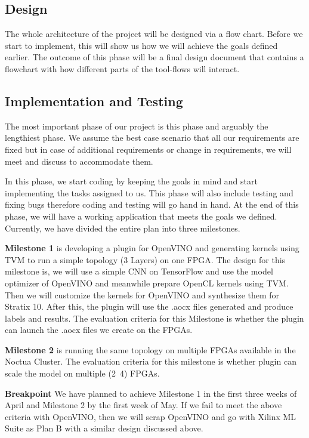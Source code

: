 \documentclass[titlepage]{report}
\begin{document}
\subsection{Design}
The whole architecture of the project will be designed via a flow chart. Before we start to implement, this will show us how we will achieve the goals defined earlier. The outcome of this phase will be a final design document that contains a flowchart with how different parts of the tool-flows will interact. 

\subsection{Implementation and Testing}
The most important phase of our project is this phase and arguably the lengthiest phase. We assume the best case scenario that all our requirements are fixed but in case of additional requirements or change in requirements, we will meet and discuss to accommodate them. 

In this phase, we start coding by keeping the goals in mind and start implementing the tasks assigned to us. This phase will also include testing and fixing bugs therefore coding and testing will go hand in hand. At the end of this phase, we will have a working application that meets the goals we defined.
Currently, we have divided the entire plan into three milestones.

\textbf{Milestone 1} is developing a plugin for OpenVINO and generating kernels using TVM to run a simple topology (3 Layers) on one FPGA. The design for this milestone is, we will use a simple CNN on TensorFlow and use the model optimizer of OpenVINO and meanwhile prepare OpenCL kernels using TVM. Then we will customize the kernels for OpenVINO and synthesize them for Stratix 10. After this, the plugin will use the .aocx files generated and produce labels and results.  The evaluation criteria for this Milestone is whether the plugin can launch the .aocx files we create on the FPGAs.

\textbf{Milestone 2} is running the same topology on multiple FPGAs available in the Noctua Cluster. The evaluation criteria for this milestone is whether plugin can scale the model on multiple (2~4) FPGAs.

\textbf{Breakpoint} We have planned to achieve Milestone 1 in the first three weeks of April and Milestone 2 by the first week of May. If we fail to meet the above criteria with OpenVINO, then we will scrap OpenVINO and go with Xilinx ML Suite as Plan B with a similar design discussed above.
\end{document}
